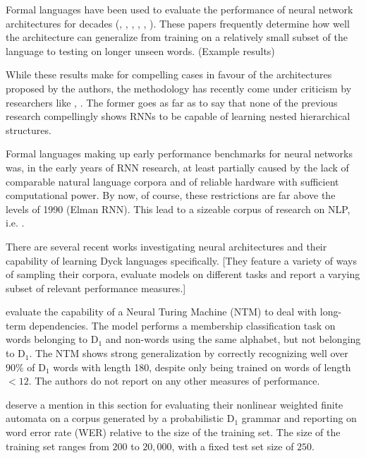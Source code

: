 Formal languages have been used to evaluate the performance of neural network architectures for decades (\cite{Cleeremans1989}, \cite{Zeng1994}, \cite{Hochreiter1997}, \cite{Rodriguez1998}, \cite{GersSchmidhuber2001}, \cite{JoulinMikolov2015}). These papers frequently determine how well the architecture can generalize from training on a relatively small subset of the language to testing on longer unseen words. (Example results)


While these results make for compelling cases in favour of the architectures proposed by the authors, the methodology has recently come under criticism by researchers like \cite{Bernardy2018}, \cite{Sennhauser2018}. The former goes as far as to say that none of the previous research compellingly shows RNNs to be capable of learning nested hierarchical structures.


Formal languages making up early performance benchmarks for neural networks was, in the early years of RNN research, at least partially caused by the lack of comparable natural language corpora and of reliable hardware with sufficient computational power. By now, of course, these restrictions are far above the levels of 1990 (Elman RNN). This lead to a sizeable corpus of research on NLP, i.e. \cite{Karpathy2015}.


There are several recent works investigating neural architectures and their capability of learning Dyck languages specifically. [They feature a variety of ways of sampling their corpora, evaluate models on different tasks and report a varying subset of relevant performance measures.]

\cite{Deleu2016} evaluate the capability of a Neural Turing Machine (NTM) to deal with long-term dependencies. The model performs a membership classification task on words belonging to D$_1$ and non-words using the same alphabet, but not belonging to D$_1$. The NTM shows strong generalization by correctly recognizing well over $90 \%$ of D$_1$ words with length 180, despite only being trained on words of length $<12$. The authors do not report on any other measures of performance.

\cite{Li2018} deserve a mention in this section for evaluating their nonlinear weighted finite automata on a corpus generated by a probabilistic D$_1$ grammar and reporting on word error rate (WER) relative to the size of the training set. The size of the training set ranges from $200$ to $20,000$, with a fixed test set size of $250$.

